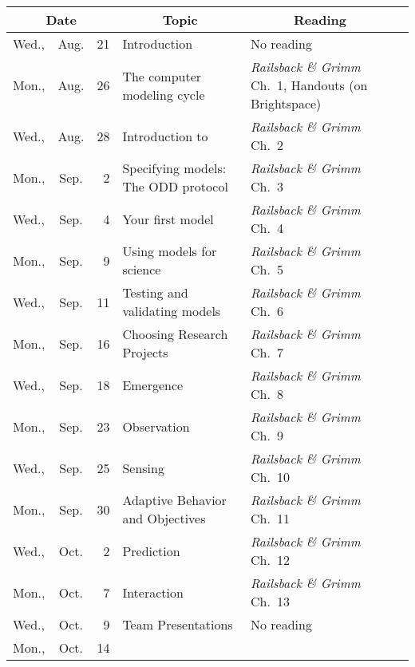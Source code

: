 \documentclass[11pt,twoside]{jgsyllabus}\usepackage[]{graphicx}\usepackage[]{xcolor}
\begin{document}
\begin{center}
\begin{tabular}{l@{~}c@{~}r>{\raggedright}m{2.6in}>{\centering}m{2in}c}
  \toprule
  \multicolumn{3}{c}{\bfseries Date} & \multicolumn{1}{c}{\bfseries Topic} &\multicolumn{1}{c}{\bfseries Reading} &\\
 \midrule
Wed., & Aug. &  21 & Introduction & No reading &  \\ 
   \midrule
Mon., & Aug. &  26 & The computer modeling cycle & \emph{Railsback \& Grimm\/} Ch.~1, Handouts (on Brightspace) &  \\ 
   \midrule
Wed., & Aug. &  28 & Introduction to \NetLogo{} & \emph{Railsback \& Grimm\/} Ch.~2 &  \\ 
   \midrule
Mon., & Sep. &   2 & Specifying models: The ODD protocol & \emph{Railsback \& Grimm\/} Ch.~3 &  \\ 
   \midrule
Wed., & Sep. &   4 & Your first model & \emph{Railsback \& Grimm\/} Ch.~4 &  \\ 
   \midrule
Mon., & Sep. &   9 & Using models for science & \emph{Railsback \& Grimm\/} Ch.~5 &  \\ 
   \midrule
Wed., & Sep. &  11 & Testing and validating models & \emph{Railsback \& Grimm\/} Ch.~6 &  \\ 
   \midrule
Mon., & Sep. &  16 & Choosing Research Projects & \emph{Railsback \& Grimm\/} Ch.~7 &  \\ 
   \midrule
Wed., & Sep. &  18 & Emergence & \emph{Railsback \& Grimm\/} Ch.~8 &  \\ 
   \midrule
Mon., & Sep. &  23 & Observation & \emph{Railsback \& Grimm\/} Ch.~9 &  \\ 
   \midrule
Wed., & Sep. &  25 & Sensing & \emph{Railsback \& Grimm\/} Ch.~10 &  \\ 
   \midrule
Mon., & Sep. &  30 & Adaptive Behavior and Objectives & \emph{Railsback \& Grimm\/} Ch.~11 &  \\ 
   \midrule
Wed., & Oct. &   2 & Prediction & \emph{Railsback \& Grimm\/} Ch.~12 &  \\ 
   \midrule
Mon., & Oct. &   7 & Interaction & \emph{Railsback \& Grimm\/} Ch.~13 &  \\ 
   \midrule
Wed., & Oct. &   9 & Team Presentations & No reading &  \\ 
   \midrule
Mon., & Oct. &  14 & \multicolumn{2}{l}{\bfseries\scshape\large Fall Break} & \\%

\end{tabular}
\end{center}
\end{document}
